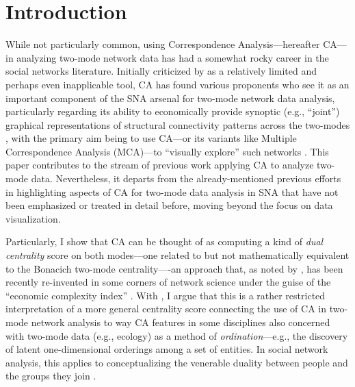 \documentclass[a4paper,fleqn]{cas-sc}
\begin{document}
\maketitle
\newpage
\section{Introduction} \label{sec:intro}
While not particularly common, using Correspondence Analysis---hereafter CA---in analyzing two-mode network data has had a somewhat rocky career in the social networks literature. Initially criticized by \citet{borgatti1997network} as a relatively limited and perhaps even inapplicable tool, CA has found various proponents who see it as an important component of the SNA arsenal for two-mode network data analysis, particularly regarding its ability to economically provide synoptic (e.g., ``joint'') graphical representations of structural connectivity patterns across the two-modes \citep{roberts2000correspondence, breiger2000tool, faust2005using}, with the primary aim being to use CA---or its variants like Multiple Correspondence Analysis (MCA)---to ``visually explore'' such networks \citep{d2014use}. This paper contributes to the stream of previous work applying CA to analyze two-mode data. Nevertheless, it departs from the already-mentioned previous efforts in highlighting aspects of CA for two-mode data analysis in SNA that have not been emphasized or treated in detail before, moving beyond the focus on data visualization. 

Particularly, I show that CA can be thought of as computing a kind of \textit{dual centrality} score on both modes---one related to but not mathematically equivalent to the Bonacich \citeyearpar{bonacich1991simultaneous} two-mode centrality----an approach that, as noted by \citet{van2021correspondence}, has been recently re-invented in some corners of network science under the guise of the ``economic complexity index'' \citep{hidalgo2009building, mealy2019interpreting}. With \citet{van2021correspondence}, I argue that this is a rather restricted interpretation of a more general centrality score connecting the use of CA in two-mode network analysis to way CA features in some disciplines also concerned with two-mode data (e.g., ecology) as a method of \textit{ordination}---e.g., the discovery of latent one-dimensional orderings among a set of entities. In social network analysis, this applies to conceptualizing the venerable duality between people and the groups they join \citep{breiger1974duality}.
\end{document}
